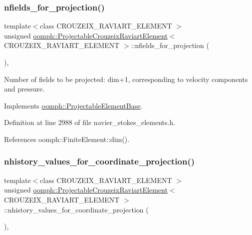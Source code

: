 \subsubsection{\texorpdfstring{nfields\+\_\+for\+\_\+projection()}{nfields\_for\_projection()}}
{\footnotesize\ttfamily template$<$class C\+R\+O\+U\+Z\+E\+I\+X\+\_\+\+R\+A\+V\+I\+A\+R\+T\+\_\+\+E\+L\+E\+M\+E\+NT $>$ \\
unsigned \hyperlink{classoomph_1_1ProjectableCrouzeixRaviartElement}{oomph\+::\+Projectable\+Crouzeix\+Raviart\+Element}$<$ C\+R\+O\+U\+Z\+E\+I\+X\+\_\+\+R\+A\+V\+I\+A\+R\+T\+\_\+\+E\+L\+E\+M\+E\+NT $>$\+::nfields\+\_\+for\+\_\+projection (\begin{DoxyParamCaption}{ }\end{DoxyParamCaption})\hspace{0.3cm}{\ttfamily [inline]}, {\ttfamily [virtual]}}



Number of fields to be projected\+: dim+1, corresponding to velocity components and pressure. 



Implements \hyperlink{classoomph_1_1ProjectableElementBase_a44634aa4049332a580d249c25564638c}{oomph\+::\+Projectable\+Element\+Base}.



Definition at line 2988 of file navier\+\_\+stokes\+\_\+elements.\+h.



References oomph\+::\+Finite\+Element\+::dim().

\mbox{\label{classoomph_1_1ProjectableCrouzeixRaviartElement_a95661958f80183560ddd50bb201a0532}} 
\subsubsection{\texorpdfstring{nhistory\+\_\+values\+\_\+for\+\_\+coordinate\+\_\+projection()}{nhistory\_values\_for\_coordinate\_projection()}}
{\footnotesize\ttfamily template$<$class C\+R\+O\+U\+Z\+E\+I\+X\+\_\+\+R\+A\+V\+I\+A\+R\+T\+\_\+\+E\+L\+E\+M\+E\+NT $>$ \\
unsigned \hyperlink{classoomph_1_1ProjectableCrouzeixRaviartElement}{oomph\+::\+Projectable\+Crouzeix\+Raviart\+Element}$<$ C\+R\+O\+U\+Z\+E\+I\+X\+\_\+\+R\+A\+V\+I\+A\+R\+T\+\_\+\+E\+L\+E\+M\+E\+NT $>$\+::nhistory\+\_\+values\+\_\+for\+\_\+coordinate\+\_\+projection (\begin{DoxyParamCaption}{ }\end{DoxyParamCaption})\hspace{0.3cm}{\ttfamily [inline]}, {\ttfamily [virtual]}}



